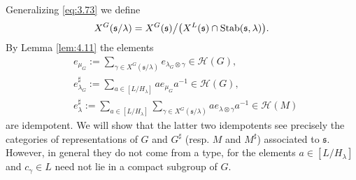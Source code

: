 \documentclass[11pt]{amsart}
\theoremstyle{definition}
\begin{document}
Generalizing \eqref{eq:3.73} we define \label{i:72}
\[
X^G ({{\mathfrak s}} / \lambda) = X^G ({{\mathfrak s}}) \big/ \big( X^L ({{\mathfrak s}}) \cap {{\rm Stab}} ({{\mathfrak s}},\lambda) \big) .
\]
By Lemma \ref{lem:4.11} the elements \label{i:05}\label{i:07}\label{i:08}
\begin{equation}\label{eq:3.71}
\begin{split}
& e_{\mu_G} := \sum\nolimits_{\gamma \in X^G ({{\mathfrak s}} / \lambda)} 
e_{\lambda_G \otimes \gamma} \in {{\mathcal H}} (G) , \\
& e^\sharp_{\lambda_G} := \sum\nolimits_{a \in [L / H_\lambda]} 
a e_{\mu_G} a^{-1} \in {{\mathcal H}} (G) , \\
& e^\sharp_{\lambda} := \sum\nolimits_{a \in [L / H_\lambda]} 
\sum\nolimits_{\gamma \in X^G ({{\mathfrak s}} / \lambda)} 
a e_{\lambda \otimes \gamma} a^{-1} \in {{\mathcal H}} (M) 
\end{split}
\end{equation}
are idempotent. We will show that the latter two idempotents see precisely the categories 
of representations of $G$ and $G^\sharp$ (resp. $M$ and $M^\sharp$) associated to ${{\mathfrak s}}$. 
However, in general they do not come from a type, for the elements $a \in [L / H_\lambda]$ 
and $c_\gamma \in L$ need not lie in a compact subgroup of $G$.
\end{document}
